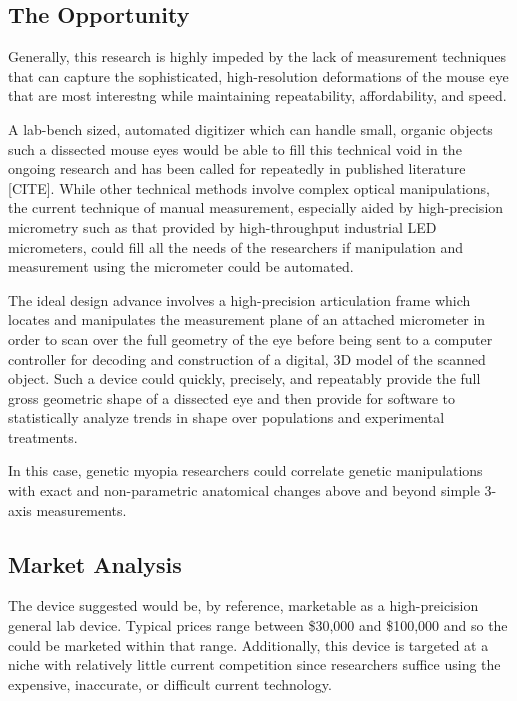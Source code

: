 \documentclass{article}
\begin{document}
\subsection{The Opportunity}
\label{sec:opportunity}

Generally, this research is highly impeded by the lack of measurement
techniques that can capture the sophisticated, high-resolution
deformations of the mouse eye that are most interestng while
maintaining repeatability, affordability, and speed.

A lab-bench sized, automated digitizer which can handle small, organic
objects such a dissected mouse eyes would be able to fill this
technical void in the ongoing research and has been called for
repeatedly in published literature [CITE]. While other technical
methods involve complex optical manipulations, the current technique
of manual measurement, especially aided by high-precision micrometry
such as that provided by high-throughput industrial LED micrometers,
could fill all the needs of the researchers if manipulation and
measurement using the micrometer could be automated.

The ideal design advance involves a high-precision articulation frame
which locates and manipulates the measurement plane of an attached
micrometer in order to scan over the full geometry of the eye before
being sent to a computer controller for decoding and construction of a
digital, 3D model of the scanned object. Such a device could quickly,
precisely, and repeatably provide the full gross geometric shape of a
dissected eye and then provide for software to statistically analyze
trends in shape over populations and experimental treatments.

In this case, genetic myopia researchers could correlate genetic
manipulations with exact and non-parametric anatomical changes above
and beyond simple 3-axis measurements.

\subsection{Market Analysis}
\label{sec:market-analysis}

The device suggested would be, by reference, marketable as a
high-preicision general lab device. Typical prices range between
\$30,000 and \$100,000 and so the could be marketed within that
range. Additionally, this device is targeted at a niche with
relatively little current competition since researchers suffice using
the expensive, inaccurate, or difficult current technology.
\end{document}

